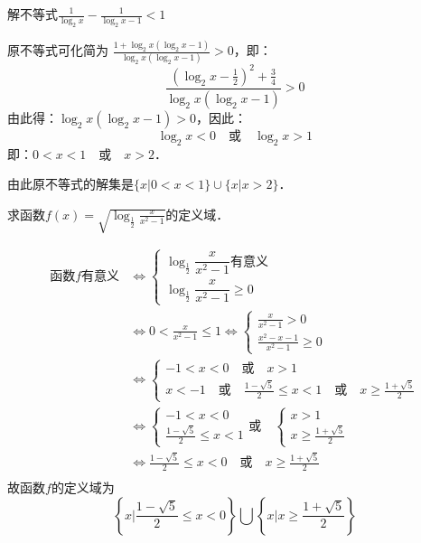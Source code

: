 \begin{example}
  解不等式$\frac{1}{\log_2 x}-\frac{1}{\log_2 x-1}<1$
\end{example}

\begin{solution}
  原不等式可化简为 $\frac{1+\log_2 x(\log_2 x-1)}{\log_2 x(\log_2 x-1)}>0$，即：
\[\frac{\left(\log_2 x-\frac{1}{2}\right)^2+\frac{3}{4}}{\log_2 x(\log_2 x-1)}>0\]
由此得：$\log_2 x(\log_2 x-1)>0$，因此：
\[\log_2 x<0\quad \text{或}\quad \log_2 x>1\]
即：$0<x<1\quad \text{或}\quad x>2$．

由此原不等式的解集是$\{x|0<x<1\}\cup\{x|x>2\}$．
\end{solution}

\begin{example}
  求函数$f(x)=\sqrt{\log_{\tfrac{1}{2}}\frac{x}{x^2-1}}$的定义域．
\end{example}

\begin{solution}
\[\begin{split}
  \text{函数$f$有意义}&\Longleftrightarrow \begin{cases}
    \log_{\tfrac{1}{2}}\dfrac{x}{x^2-1}\text{有意义}\\ \log_{\tfrac{1}{2}}\dfrac{x}{x^2-1}\ge 0
  \end{cases}\\
  &\Longleftrightarrow  0<   \frac{x}{x^2-1}\le 1    \Longleftrightarrow  \begin{cases}
    \frac{x}{x^2-1}>0\\ \frac{x^2-x-1}{x^2-1}\ge 0
  \end{cases}           \\
  &\Longleftrightarrow     \begin{cases}
    -1<x<0\quad \text{或}\quad x>1\\
    x<-1\quad \text{或}\quad \frac{1-\sqrt{5}}{2}\le x<1\quad \text{或}\quad x\ge\frac{1+\sqrt{5}}{2}
  \end{cases}               \\
  &\Longleftrightarrow   \begin{cases}
    -1<x<0\\  \frac{1-\sqrt{5}}{2}\le x<1
  \end{cases}      \text{或}\quad  \begin{cases}
    x>1\\x\ge\frac{1+\sqrt{5}}{2}
  \end{cases}           \\
  &\Longleftrightarrow    \frac{1-\sqrt{5}}{2}\le x<0  \quad \text{或}\quad   x\ge\frac{1+\sqrt{5}}{2}   \\
\end{split}\]
故函数$f$的定义域为
\[\left\{x\Big| \frac{1-\sqrt{5}}{2}\le x<0 \right\}\bigcup\left\{x\Big|x\ge\frac{1+\sqrt{5}}{2}  \right\}\]
\end{solution}


